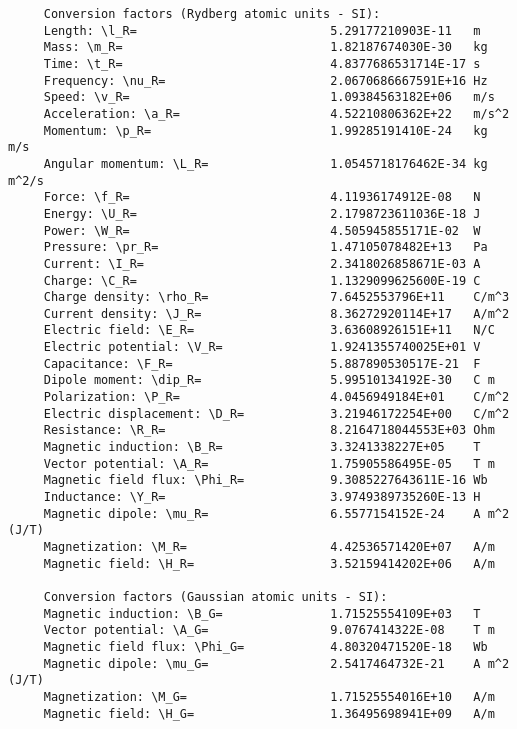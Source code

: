 \documentclass[12pt,a4paper]{article}
\begin{document}
\begin{verbatim}
     Conversion factors (Rydberg atomic units - SI):
     Length: \l_R=                           5.29177210903E-11   m
     Mass: \m_R=                             1.82187674030E-30   kg
     Time: \t_R=                             4.8377686531714E-17 s
     Frequency: \nu_R=                       2.0670686667591E+16 Hz
     Speed: \v_R=                            1.09384563182E+06   m/s
     Acceleration: \a_R=                     4.52210806362E+22   m/s^2
     Momentum: \p_R=                         1.99285191410E-24   kg m/s
     Angular momentum: \L_R=                 1.0545718176462E-34 kg m^2/s
     Force: \f_R=                            4.11936174912E-08   N
     Energy: \U_R=                           2.1798723611036E-18 J
     Power: \W_R=                            4.505945855171E-02  W
     Pressure: \pr_R=                        1.47105078482E+13   Pa
     Current: \I_R=                          2.3418026858671E-03 A
     Charge: \C_R=                           1.1329099625600E-19 C
     Charge density: \rho_R=                 7.6452553796E+11    C/m^3
     Current density: \J_R=                  8.36272920114E+17   A/m^2
     Electric field: \E_R=                   3.63608926151E+11   N/C
     Electric potential: \V_R=               1.9241355740025E+01 V
     Capacitance: \F_R=                      5.887890530517E-21  F
     Dipole moment: \dip_R=                  5.99510134192E-30   C m
     Polarization: \P_R=                     4.0456949184E+01    C/m^2
     Electric displacement: \D_R=            3.21946172254E+00   C/m^2
     Resistance: \R_R=                       8.2164718044553E+03 Ohm
     Magnetic induction: \B_R=               3.3241338227E+05    T
     Vector potential: \A_R=                 1.75905586495E-05   T m
     Magnetic field flux: \Phi_R=            9.3085227643611E-16 Wb
     Inductance: \Y_R=                       3.9749389735260E-13 H
     Magnetic dipole: \mu_R=                 6.5577154152E-24    A m^2 (J/T)
     Magnetization: \M_R=                    4.42536571420E+07   A/m
     Magnetic field: \H_R=                   3.52159414202E+06   A/m

     Conversion factors (Gaussian atomic units - SI):
     Magnetic induction: \B_G=               1.71525554109E+03   T
     Vector potential: \A_G=                 9.0767414322E-08    T m
     Magnetic field flux: \Phi_G=            4.80320471520E-18   Wb
     Magnetic dipole: \mu_G=                 2.5417464732E-21    A m^2 (J/T)
     Magnetization: \M_G=                    1.71525554016E+10   A/m
     Magnetic field: \H_G=                   1.36495698941E+09   A/m


\end{verbatim}
\end{document}
